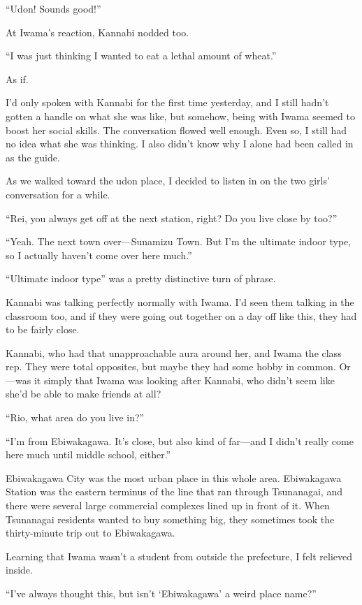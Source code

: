 \documentclass[
    a4paper,
    12pt,
    twoside,
    openany,
    UTF8,
    fontset=windows
]{ctexbook}
\begin{document}
``Udon! Sounds good!''

At Iwama's reaction, Kannabi nodded too.

``I was just thinking I wanted to eat a lethal amount of wheat.''

As if.

I'd only spoken with Kannabi for the first time yesterday, and I still hadn't gotten a handle on what she was like, but somehow, being with Iwama seemed to boost her social skills. The conversation flowed well enough. Even so, I still had no idea what she was thinking. I also didn't know why I alone had been called in as the guide.

As we walked toward the udon place, I decided to listen in on the two girls' conversation for a while.

``Rei, you always get off at the next station, right? Do you live close by too?''

``Yeah. The next town over---Sunamizu Town. But I'm the ultimate indoor type, so I actually haven't come over here much.''

``Ultimate indoor type'' was a pretty distinctive turn of phrase.

Kannabi was talking perfectly normally with Iwama. I'd seen them talking in the classroom too, and if they were going out together on a day off like this, they had to be fairly close.

Kannabi, who had that unapproachable aura around her, and Iwama the class rep. They were total opposites, but maybe they had some hobby in common. Or---was it simply that Iwama was looking after Kannabi, who didn't seem like she'd be able to make friends at all?

``Rio, what area do you live in?''

``I'm from Ebiwakagawa. It's close, but also kind of far---and I didn't really come here much until middle school, either.''

Ebiwakagawa City was the most urban place in this whole area. Ebiwakagawa Station was the eastern terminus of the line that ran through Tsunanagai, and there were several large commercial complexes lined up in front of it. When Tsunanagai residents wanted to buy something big, they sometimes took the thirty-minute trip out to Ebiwakagawa.

Learning that Iwama wasn't a student from outside the prefecture, I felt relieved inside.

``I've always thought this, but isn't `Ebiwakagawa' a weird place name?''
\end{document}
